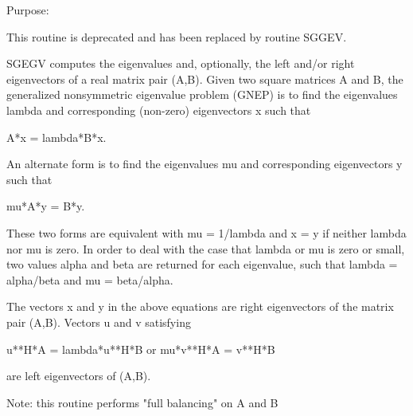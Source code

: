  \begin{DoxyParagraph}{Purpose\+: }
\begin{DoxyVerb} This routine is deprecated and has been replaced by routine SGGEV.

 SGEGV computes the eigenvalues and, optionally, the left and/or right
 eigenvectors of a real matrix pair (A,B).
 Given two square matrices A and B,
 the generalized nonsymmetric eigenvalue problem (GNEP) is to find the
 eigenvalues lambda and corresponding (non-zero) eigenvectors x such
 that

    A*x = lambda*B*x.

 An alternate form is to find the eigenvalues mu and corresponding
 eigenvectors y such that

    mu*A*y = B*y.

 These two forms are equivalent with mu = 1/lambda and x = y if
 neither lambda nor mu is zero.  In order to deal with the case that
 lambda or mu is zero or small, two values alpha and beta are returned
 for each eigenvalue, such that lambda = alpha/beta and
 mu = beta/alpha.

 The vectors x and y in the above equations are right eigenvectors of
 the matrix pair (A,B).  Vectors u and v satisfying

    u**H*A = lambda*u**H*B  or  mu*v**H*A = v**H*B

 are left eigenvectors of (A,B).

 Note: this routine performs "full balancing" on A and B\end{DoxyVerb}
 
\end{DoxyParagraph}

